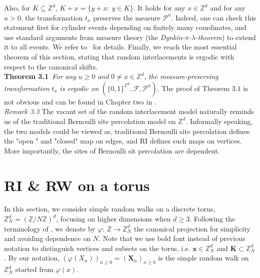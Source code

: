 \documentclass[
11pt, %
a4paper, %
oneside, %
headinclude,footinclude, %
BCOR5mm, %
]{scrartcl}
\begin{document}
Also, for $K \subseteq \mathbb{Z}^d$, $K+x=\{ y+x: \ y \in K \}$. It holds for any $x \in \mathbb{Z}^d$ and for any $u>0$, the transformation $t_x$ preserves the measure $\mathscr{P}^u$. Indeed, one can check this statement first for cylinder events depending on finitely many coordinates, and use standard arguments from measure theory (the \textit{Dynkin-$\pi$-$\lambda$-theorem}) to extend it to all events. We refer to~\cite[Lemma 2.8]{drewitz2014introduction} for details. Finally, we reach the most essential theorem of this section, stating that random interlacements is ergodic with respect to the canonical shifts.
\vspace{0.6em}\\\textbf{Theorem 3.1}\ \textit{For any }$u \geq 0$ \textit{and} $0 \neq x \in \mathbb{Z}^d$, \textit{the measure-preserving transformation} $t_x$ \textit{is ergodic on} $(\{0,1\}^{\mathbb{Z}^d},\mathscr{F},\mathscr{P}^u)$.
The proof of Theorem $3.1$ is not obvious and can be found in Chapter two in \cite{drewitz2014introduction}. 
\vspace{0.6em}\\\textit{Remark 3.3} The vacant set of the random interlacement model naturally reminds us of the traditional Bernoulli site percolation model on $\mathbb{Z}^d$. Informally speaking, the two models could be viewed as, traditional Bernoulli site percolation defines the "open
" and "closed" map on edges, and RI defines such maps on vertices. More importantly, the sites of Bernoulli sit percolation are dependent.

\section{RI \& RW on a torus}
In this section, we consider simple random walks on a discrete torus, $\mathbb{Z}_N^d=(\mathbb{Z}/N\mathbb{Z})^d$, focusing on higher dimensions when $d \geq 3$. Following the terminology of \cite{drewitz2014introduction}, we denote by $\varphi : \ \mathbb{Z} \rightarrow \mathbb{Z}_N^d$ the canonical projection for simplicity and avoiding dependence on $N$. Note that we use bold font instead of previous notation to distinguish vertices and subsets on the torus, i.e. $\mathbf{x} \in \mathbb{Z}_N^d$ and $\mathbf{K} \subset \mathbb{Z}_N^d$. By our notation, $(\varphi(X_n))_{n \geq 0}=(\mathbf{X}_n)_{n \geq 0}$ is the simple random walk on $\mathbb{Z}_N^d$ started from $\varphi(x)$.
\end{document}
